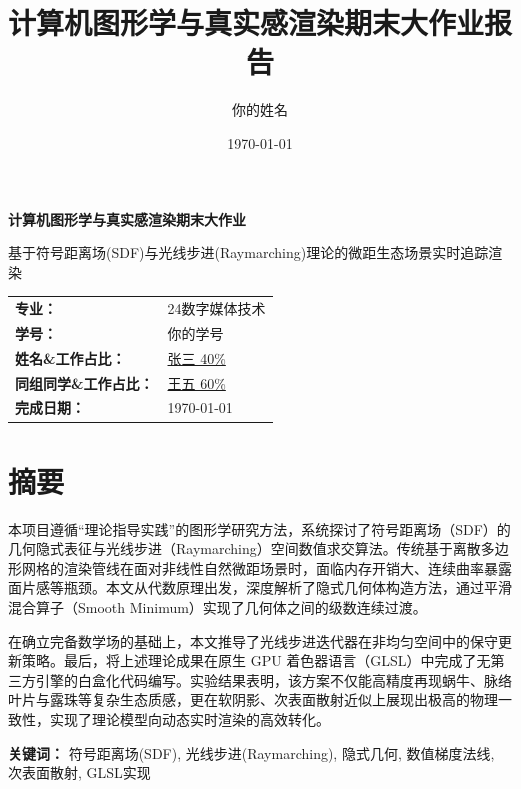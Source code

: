 \documentclass[11pt, a4paper, oneside]{report}
\title{计算机图形学与真实感渲染期末大作业报告}
\author{你的姓名}
\date{\today}
\begin{document}
\begin{titlepage}
    \centering
    \vspace*{2cm}
    {\Huge\bfseries 计算机图形学与真实感渲染期末大作业\par}
    \vspace{1.5cm}
    {\LARGE 基于符号距离场(SDF)与光线步进(Raymarching)理论的微距生态场景实时追踪渲染\par}
   
    \vspace{3cm}
    {\large
     \begin{tabular}{ll}
        \textbf{专业：} & 24数字媒体技术 \\[0.8em] 
        \textbf{学号：} & 你的学号 \\[0.8em] 
        \textbf{姓名\&工作占比：} & \underline{张三 40\%} \\[0.8em] 
        \textbf{同组同学\&工作占比：} & \underline{王五 60\%}\\[0.8em] 
        \textbf{完成日期：} & \today \\[0.8em] 
    \end{tabular}
    \par}
    \vfill
\end{titlepage}

\chapter*{摘要}
本项目遵循“理论指导实践”的图形学研究方法，系统探讨了符号距离场（SDF）的几何隐式表征与光线步进（Raymarching）空间数值求交算法。传统基于离散多边形网格的渲染管线在面对非线性自然微距场景时，面临内存开销大、连续曲率暴露面片感等瓶颈。本文从代数原理出发，深度解析了隐式几何体构造方法，通过平滑混合算子（Smooth Minimum）实现了几何体之间的级数连续过渡。

在确立完备数学场的基础上，本文推导了光线步进迭代器在非均匀空间中的保守更新策略。最后，将上述理论成果在原生 GPU 着色器语言（GLSL）中完成了无第三方引擎的白盒化代码编写。实验结果表明，该方案不仅能高精度再现蜗牛、脉络叶片与露珠等复杂生态质感，更在软阴影、次表面散射近似上展现出极高的物理一致性，实现了理论模型向动态实时渲染的高效转化。

\textbf{关键词：} 符号距离场(SDF), 光线步进(Raymarching), 隐式几何, 数值梯度法线, 次表面散射, GLSL实现
\end{document}
